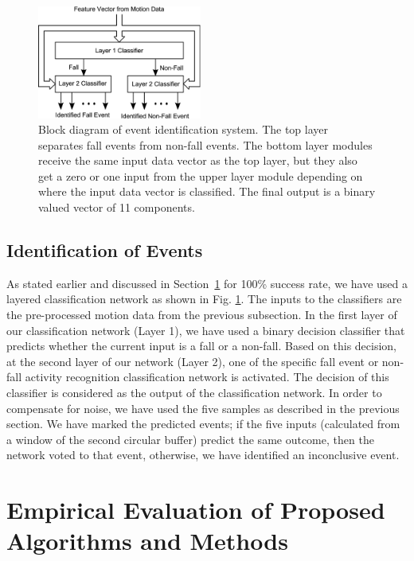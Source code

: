 \documentclass[]{IEEEtran}
\begin{document}
\begin{figure}[h]
	\centering
		\includegraphics[width=0.48\textwidth]{figures/TrainedIdentificationModule.eps}
	\caption{Block diagram of event identification system. The top layer separates fall events from non-fall events. The bottom layer modules receive the same input data vector as the top layer, but they also get a zero or one input from the upper layer module depending on where the input data vector is classified. The final output is a binary valued vector of 11 components.}
	\label{fig:TrainedIdentificationModule}
\end{figure}


\subsection{Identification of Events}

As stated earlier and discussed in Section~\ref{Evaluation} for 100\% success rate, we have used a layered classification network as 
shown in Fig. \ref{fig:TrainedIdentificationModule}. The inputs to the classifiers are 
the 
pre-processed motion data from the previous subsection. In the first layer of our 
classification network (Layer 1), we have used a binary decision classifier that predicts 
whether the current input is a fall or a non-fall. Based on this decision, at the second 
layer of our network (Layer 2), one of the specific fall event or non-fall activity 
recognition classification network is activated. The decision of this classifier is 
considered as the output of the classification network. In order to compensate for noise, 
we have used the five samples as described in the previous section. We have marked the 
predicted events; if the five inputs (calculated from a window of the second circular 
buffer) 
predict the same outcome, then the network voted 
to that event, otherwise, we have identified an inconclusive event. 



\section{Empirical Evaluation of Proposed Algorithms and Methods}
\label{Evaluation}
\end{document}
